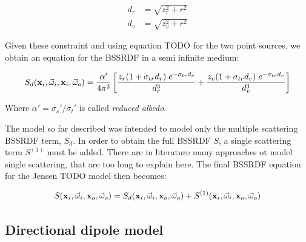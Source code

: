\begin{equation*}
\begin{split}
d_r &= \sqrt{z_r^2 + r^2} \\
d_v &= \sqrt{z_v^2 + r^2}
\end{split}
\end{equation*}

Given these constraint and using equation TODO for the two point sources, we obtain an equation for the BSSRDF in a semi infinite medium:

$$
S_d(\mathbf{x}_i,\vec{\omega}_i,\mathbf{x}_i,\vec{\omega}_o) = \frac{\alpha'}{4 \pi^2} \left[\frac{z_r (1 + \sigma_{tr} d_r) \; e^{-\sigma_{tr} d_r}}{d_r^3} + \frac{z_v (1 + \sigma_{tr} d_v) \; e^{-\sigma_{tr} d_v}}{d_v^3} \right]
$$

Where $\alpha' = \sigma_s' / \sigma_t'$ is called \emph{reduced albedo}.

The model so far described was intended to model only the multiple scattering BSSRDF term, $S_d$. In order to obtain the full BSSRDF $S$, a single scattering term $S^{(1)}$ must be added. There are in literature many approaches ot model single scattering, that are too long to explain here. The final BSSRDF equation for the Jensen TODO model then becomes:

$$
S(\mathbf{x}_i, \vec{\omega}_i, \mathbf{x}_o, \vec{\omega}_o) = S_d(\mathbf{x}_i, \vec{\omega}_i, \mathbf{x}_o, \vec{\omega}_o) + S^{(1)}(\mathbf{x}_i, \vec{\omega}_i, \mathbf{x}_o, \vec{\omega}_o)
$$

\subsection{Directional dipole model}
